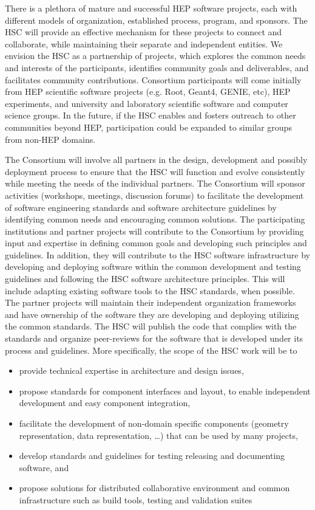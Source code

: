 \documentclass[12pt,letterpaper,fleqn]{article}
\begin{document}
There is a plethora of mature and successful HEP software projects,
each with different models of organization, established process,
program, and sponsors.  The HSC will provide an effective mechanism
for these projects to connect and collaborate, while maintaining
their separate and independent entities.  We envision the HSC as a
partnership of projects, which explores the common needs and interests
of the participants, identifies community goals and deliverables,
and facilitates community contributions. Consortium participants
will come initially from HEP scientific software projects (e.g.
Root, Geant4, GENIE, etc), HEP experiments, and university and
laboratory scientific software and computer science groups.  In the
future, if the HSC enables and fosters outreach to other communities
beyond HEP, participation could be expanded to similar groups from
non-HEP domains.

The Consortium will involve all partners in the design, development
and possibly deployment process to ensure that the HSC will function
and evolve consistently while meeting the needs of the individual
partners.  The Consortium will sponsor activities (workshops,
meetings, discussion forums) to facilitate the development of
software engineering standards and software architecture guidelines
by identifying common needs and encouraging common solutions. The
participating institutions and partner projects will contribute to
the Consortium by providing input and expertise in defining common
goals and developing such principles and guidelines.  In addition,
they will contribute to the HSC software infrastructure by developing
and deploying software within the common development and testing
guidelines and following the HSC software architecture principles.
This will include adapting existing software tools to the HSC
standards, when possible.  The partner projects will maintain their
independent organization frameworks and have ownership of the
software they are developing and deploying utilizing the common
standards.  The HSC will publish the code that complies with the
standards and organize peer-reviews for the software that is developed
under its process and guidelines.  More specifically, the scope of
the HSC work will be to
\begin{itemize}
\item provide technical expertise in architecture and design issues,
\item propose standards for component interfaces and layout, to
enable independent development and easy component integration,
\item facilitate the development of non-domain specific components
(geometry representation, data representation, …) that can be used
by many projects,
\item develop standards and guidelines for testing releasing and
documenting software, and
\item propose solutions for distributed collaborative environment
and common infrastructure such as build tools, testing and validation
suites
\end{itemize}
\end{document}
